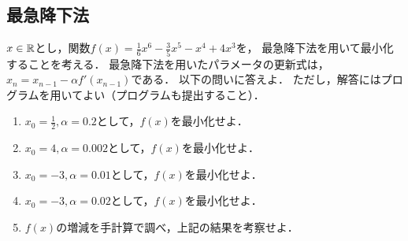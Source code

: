 \subsection{最急降下法}
  $x \in \mathbb{R}$とし，関数$f(x) = \frac{1}{6}x^6 - \frac{3}{5}x^5 - x^4 + 4x^3$を，
  最急降下法を用いて最小化することを考える．
  最急降下法を用いたパラメータの更新式は，$x_n = x_{n-1} - \alpha f'(x_{n-1})$である．
  以下の問いに答えよ．
  ただし，解答にはプログラムを用いてよい（プログラムも提出すること）．
  \begin{enumerate}[label=(\roman*)]
    \item $x_0 = \frac{1}{2}, \alpha = 0.2$として，$f(x)$を最小化せよ．
    \item $x_0 = 4, \alpha = 0.002$として，$f(x)$を最小化せよ．
    \item $x_0 = -3, \alpha = 0.01$として，$f(x)$を最小化せよ．
    \item $x_0 = -3, \alpha = 0.02$として，$f(x)$を最小化せよ．
    \item $f(x)$の増減を手計算で調べ，上記の結果を考察せよ．
  \end{enumerate}
